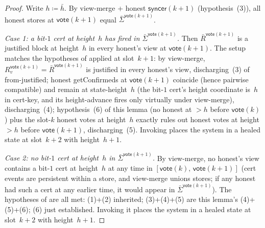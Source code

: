 \documentclass{article}
\newcommand{\syncer}{\mathsf{syncer}}
\newcommand{\vote}{\mathsf{vote}}
\newcommand{\comm}[1]{\bar{#1}}
\newcommand{\getConfirmed}{\textsf{getConfirmed}\xspace}
\theoremstyle{plain}
\theoremstyle{definition}
\theoremstyle{remark}
\begin{document}
\begin{proof}
Write $h \coloneqq \comm{h}$. By view-merge + honest $\syncer(k+1)$ (hypothesis~(3)), all honest stores at $\vote(k+1)$ equal $\comm{\Sigma}^{\vote(k+1)}$.

\emph{Case 1: a bit-$1$ cert at height~$h$ has fired in $\comm{\Sigma}^{\vote(k+1)}$.}
Then $\comm{R}^{\vote(k+1)}$ is a justified block at height~$h$ in every honest's view at $\vote(k+1)$. The setup matches the hypotheses of  applied at slot~$k+1$: by view-merge, $R_v^{\vote(k+1)} = \comm{R}^{\vote(k+1)}$ is justified in every honest's view, discharging~(3) of from-justified; honest \getConfirmed{}s at $\vote(k+1)$ coincide (hence pairwise compatible) and remain at state-height~$h$ (the bit-$1$ cert's height coordinate is~$h$ in cert-key, and its height-advance fires only virtually under view-merge), discharging~(4); hypothesis~(6) of this lemma (no honest at $>h$ before $\vote(k)$) plus the slot-$k$ honest votes at height~$h$ exactly rules out honest votes at height $>h$ before $\vote(k+1)$, discharging~(5). Invoking  places the system in a healed state at slot~$k+2$ with height~$h+1$.

\emph{Case 2: no bit-$1$ cert at height~$h$ in $\comm{\Sigma}^{\vote(k+1)}$.}
By view-merge, no honest's view contains a bit-$1$ cert at height~$h$ at any time in $[\vote(k),\, \vote(k+1)]$ (cert events are persistent within a store, and view-merge unions stores; if any honest had such a cert at any earlier time, it would appear in $\comm{\Sigma}^{\vote(k+1)}$). The hypotheses of  are all met: (1)+(2) inherited; (3)+(4)+(5) are this lemma's (4)+(5)+(6); (6) just established. Invoking it places the system in a healed state at slot~$k+2$ with height~$h+1$.
\end{proof}
\end{document}
